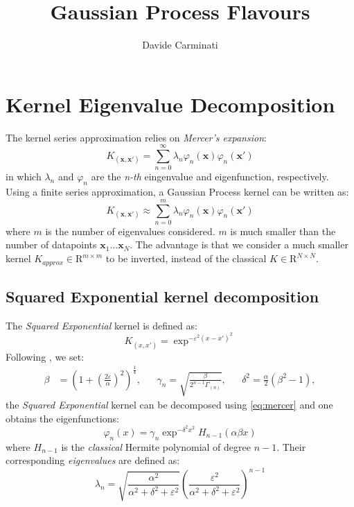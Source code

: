 \documentclass[10pt,a4paper,twocolumn]{article}
\title{\huge Gaussian Process Flavours}
\author{Davide Carminati}
\date{}
\begin{document}
	
\maketitle


\section{Kernel Eigenvalue Decomposition}\label{kernelDec}
The kernel series approximation relies on \textit{Mercer's expansion}:
\begin{equation}\label{eq:mercer}
	K_{(\mathbf{x}, \mathbf{x'})} = \sum_{n=0}^{\infty} \lambda_n \varphi_n(\mathbf{x}) \varphi_n(\mathbf{x'})
\end{equation}
in which $\lambda_n$ and $\varphi_n$ are the \textit{n-th} eingenvalue and eigenfunction, respectively.
Using a finite series approximation, a Gaussian Process kernel can be written as:
\begin{equation}\label{eq:mercerLim}
	K_{(\mathbf{x}, \mathbf{x'})} \approx \sum_{n=0}^{m} \lambda_n \varphi_n(\mathbf{x}) \varphi_n(\mathbf{x'})
\end{equation}
where $m$ is the number of eigenvalues considered. $m$ is much smaller than the number of datapoints $\mathbf{x}_1 \ldots \mathbf{x}_N$. The advantage is that we consider a much smaller kernel $K_{approx} \in \mathrm{R}^{m \times m}$ to be inverted, instead of the classical $K \in \mathrm{R}^{N \times N}$.
\subsection{Squared Exponential kernel decomposition}
The \textit{Squared Exponential} kernel is defined as:
\begin{equation}
	K_{(x,x')} = \exp^ {-\varepsilon^2 (x - x')^2 }
\end{equation}
Following \cite{fasshauer2012stable}, we set:
\small
\begin{align}
	 \beta &= \left(1 + \left(\frac{2\varepsilon}{\alpha}\right)^2\right)^\frac{1}{4}, && \gamma_n = \sqrt{\frac{\beta}{2^{n-1}\Gamma_{(n)}}}, && \delta^2 = \frac{\alpha}{2}(\beta^2-1),
\end{align}
\normalsize
the \textit{Squared Exponential} kernel can be decomposed using \autoref{eq:mercer} and one obtains the eigenfunctions:
\begin{equation}\label{eq:SEeigfun}
	\varphi_n(x) = \gamma_n \exp^{-\delta^2 x^2} H_{n-1}(\alpha \beta x)
\end{equation}
where $H_{n-1}$ is the \textit{classical} Hermite polynomial of degree $n-1$.
Their corresponding \textit{eigenvalues} are defined as:
\begin{equation}
	\lambda_n = \sqrt{\frac{\alpha^2}{\alpha^2 + \delta^2 + \varepsilon^2}} \left(\frac{\varepsilon^2}{\alpha^2 + \delta^2 + \varepsilon^2} \right)^{n-1}
\end{equation}
\end{document}
